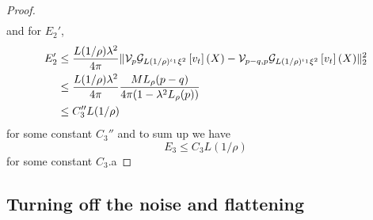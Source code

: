 \begin{proof}
\[\begin{aligned}
    \end{aligned}
    \]
    and for $E_2'$,
    \[\begin{aligned}
        E_2' &\leq \dfrac{L(1/\rho)\lambda^2}{4\pi}\lVert \mathcal{V}_p\mathcal{G}_{L(1/\rho)^{\iota_1}\xi^2}\left[{v_{t}}\right](X)
        - \mathcal{V}_{p-q,p}\mathcal{G}_{L(1/\rho)^{\iota_1}\xi^2}\left[{v_{t}}\right](X)\rVert_2^2 \\
        &\leq\dfrac{L(1/\rho)\lambda^2}{4\pi}\dfrac{ML_{\rho}(p-q)}{4\pi(1-\lambda^2 L_{\rho}(p))} \\
        &\leq C_3 '' L(1/\rho)
    \end{aligned}
    \]
    for some constant $C_3''$ and to sum up we have
    \[
    E_3 \leq C_3 L(1/\rho)
    \]
    for some constant $C_3$.a
\end{proof}


\subsection{Turning off the noise and flattening}

